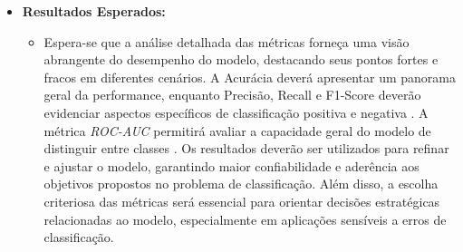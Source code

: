 \begin{itemize}
\begin{itemize}
\begin{itemize}
\begin{itemize}
        \item \textbf{Resultados Esperados:} 
        \begin{itemize}
          \item Espera-se que a análise detalhada das métricas forneça uma visão abrangente do desempenho do modelo, destacando seus pontos fortes e fracos em diferentes cenários. A Acurácia deverá apresentar um panorama geral da performance, enquanto Precisão, Recall e F1-Score deverão evidenciar aspectos específicos de classificação positiva e negativa \cite{vilela2022}. A métrica \textit{ROC-AUC} permitirá avaliar a capacidade geral do modelo de distinguir entre classes \cite{vilela2022}. Os resultados deverão ser utilizados para refinar e ajustar o modelo, garantindo maior confiabilidade e aderência aos objetivos propostos no problema de classificação. Além disso, a escolha criteriosa das métricas será essencial para orientar decisões estratégicas relacionadas ao modelo, especialmente em aplicações sensíveis a erros de classificação.
        \end{itemize}
      \end{itemize}


\end{itemize}
\end{itemize}
\end{itemize}
